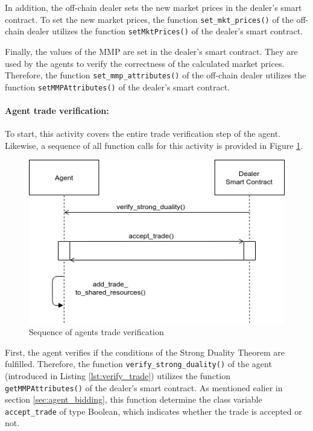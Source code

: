 In addition, the off-chain dealer sets the new market prices in the dealer's smart contract.
To set the new market prices, the function \verb|set_mkt_prices()| of the off-chain dealer 
utilizes the function \verb|setMktPrices()| of the dealer's smart contract.

Finally, the values of the MMP are set in the dealer's smart contract. 
They are used by the agents to verify the correctness of the calculated market prices.
Therefore, the function \verb|set_mmp_attributes()| of the off-chain dealer
utilizes the function \verb|setMMPAttributes()| of the dealer's smart contract.

\paragraph{Agent trade verification:}
To start, this activity covers the entire trade verification step of the agent. 
Likewise, a sequence of all function 
calls for this activity is provided in Figure \ref{figure:agents_trade_verification}.

\begin{figure}[htbp]
	\centering
	\includegraphics[width=.8\linewidth]{./figures/trade_verification.png}
	\caption{Sequence of agents trade verification}
	\label{figure:agents_trade_verification}
\end{figure}

First, the agent verifies if the conditions of the Strong Duality Theorem
are fulfilled.
Therefore, the function \verb|verify_strong_duality()| of the agent
(introduced in Listing \ref{lst:verify_trade})
utilizes the function \verb|getMMPAttributes()| of the dealer's smart contract.
As mentioned ealier in section \ref{sec:agent_bidding}, this function 
determine the class variable \verb|accept_trade| of type Boolean,
which indicates whether the trade is accepted or not.

